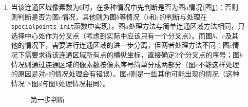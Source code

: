 \documentclass[12pt]{article}
\begin{document}
\begin{enumerate}
\begin{enumerate}
\item 当该连通区域像素数为6时，在多种情况中先判断是否为图$a$情况(图\ref{fig:complex1})：否则则判断是否为图$c$情况，其他则为图$b$等情况（$b$和$c$的判断与处理在\verb|specialpoints_init|函数中实现）。图$a$处理方法与简单连通区域方法相同，只选择中心处作为分叉点（考虑到实际中应该只有一个分叉点）。而图$b$、$c$及其他的情况下，需要进行连通区域的进一步分离，但两者处理方法不同：图$c$情况下需要求得该连通区域所有点的横纵坐标，直接确定2个分叉点的序号；图$b$情况则通过连通区域的像素数按像素序号简单分成两部分（图$c$不能这样处理的原因是对c的情况处理会有错误）。图$d$则是一些其他可能出现的情况（这种情况下图$d$与图$b$处理情况相同）。
\begin{figure}[ht]
\centering
{}
\hspace{0.2in}
\hspace{0.8in}
\caption{第一步判断}
\label{fig:complex1}
\end{figure}


\end{enumerate}
\end{enumerate}
\end{document}
